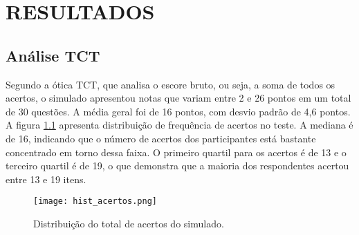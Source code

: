 \chapter{RESULTADOS}

\section{Análise TCT}

Segundo a ótica TCT, que analisa o escore bruto, ou seja, a soma de todos os acertos, o simulado apresentou notas que variam entre 2 e 26 pontos em um total de 30 questões. A média geral foi de 16 pontos, com desvio padrão de 4,6 pontos. A figura \ref{fig:hist_acertos} apresenta distribuição de frequência de acertos no teste. A mediana é de 16, indicando que o número de acertos dos participantes está bastante concentrado em torno dessa faixa. O primeiro quartil para os acertos é de 13 e o terceiro quartil é de 19, o que demonstra que a maioria dos respondentes acertou entre 13 e 19 itens.

\begin{figure}[H]
	\centering
	\caption{Distribuição do total de acertos do simulado.}
	\texttt{[image: hist\_acertos.png]}
	\label{fig:hist_acertos}
	\parbox{\textwidth}{
	\centering %
}
\end{figure}

